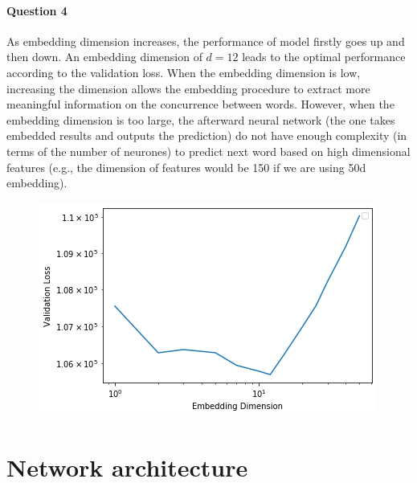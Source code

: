 \documentclass{article}
\begin{document}
    \paragraph{Question 4} As embedding dimension increases, the performance of model firstly goes up and then down. An embedding dimension of $d=12$ leads to the optimal performance according to the validation loss. When the embedding dimension is low, increasing the dimension allows the embedding procedure to extract more meaningful information on the concurrence between words. However, when the embedding dimension is too large, the afterward neural network (the one takes embedded results and outputs the prediction) do not have enough complexity (in terms of the number of neurones) to predict next word based on high dimensional features (e.g., the dimension of features would be 150 if we are using 50d embedding).
    \begin{figure}[H]
    	\centering
    	\includegraphics[width=0.7\linewidth]{performance_emb_dim.png}
    \end{figure}
    
    \section{Network architecture}
\end{document}
